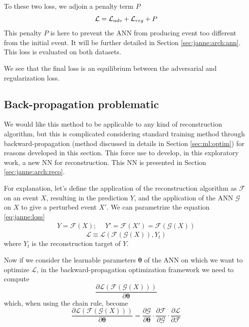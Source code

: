 \documentclass[../main.tex]{subfiles}
\begin{document}
To these two loss, we adjoin a penalty term $P$
\begin{equation}
  {\cal L} = {\cal L}_{adv} + {\cal L}_{reg} + P
\end{equation}
This penalty $P$ is here to prevent the ANN from producing event too different from the initial event. It will be further detailed in Section \ref{sec:janne:arch:ann}. This loss is evaluated on both datasets.

We see that the final loss is an equilibrium between the adversarial and regularization loss.

\subsection{Back-propagation problematic}
\label{sec:janne:back_prop}

We would like this method to be applicable to any kind of reconstruction algorithm, but this is complicated considering standard training method through backward-propagation (method discussed in details in Section \ref{sec:ml:optim}) for reasons developed in this section. This force use to develop, in this exploratory work, a new NN for reconstruction. This NN is presented in Section \ref{sec:janne:arch:reco}.

For explanation, let's define the application of the reconstruction algorithm as $\mathcal{F}$ on an event $X$, resulting in the prediction $Y$, and the application of the ANN $\mathcal{G}$ on $X$ to give a perturbed event $X'$. We can parametrize the equation \ref{eq:janne:loss}
\begin{align}
  Y = \mathcal{F}(X); ~~& Y' = \mathcal{F}(X') = \mathcal{F}(\mathcal{G}(X))
\end{align}
\begin{equation}
  \mathcal{L} \equiv \mathcal{L}(\mathcal{F}(\mathcal{G}(X)), Y_t)
\end{equation}
where $Y_t$ is the reconstruction target of $Y$.

Now if we consider the learnable parameters $\bm{\theta}$ of the ANN on which we want to optimize $\mathcal{L}$, in the backward-propagation optimization framework we need to compute
\begin{equation}
  \frac{\partial \mathcal{L}(\mathcal{F}(\mathcal{G}(X)))}{\partial \bm{\theta}}
\end{equation}
which, when using the chain rule, become
\begin{equation}
  \frac{\partial \mathcal{L}(\mathcal{F}(\mathcal{G}(X)))}{\partial \bm{\theta}} = \frac{\partial \mathcal{G}}{\partial \bm{\theta}} \cdot \frac{\partial \mathcal{F}}{\partial \mathcal{G}} \cdot \frac{\partial \mathcal{L}}{\partial \mathcal{F}}
\end{equation}
\end{document}
